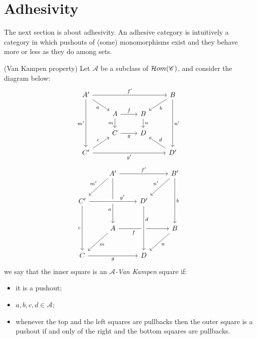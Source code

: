 \section{Adhesivity}\label{sect:adh}

The next section is about adhesivity.
An adhesive category is intuitively a category in which pushouts of (some) monomorphisms exist and they behave more or less as they do among sets. 

\begin{definition}(Van Kampen property)
    Let $\mathcal A$ be a subclass of $\mathcal{H}om(\mathscr{C})$, and consider the diagram below:
    \[
    \begin{tikzcd}[row sep = scriptsize]
        A' \arrow[ddd, "m'"swap] \arrow[rrr, "f'"] \arrow[dr, "a"swap] & & & B \arrow[ddd, "n'"] \arrow[dl, "b"] \\
        & A \arrow[r, "f"] \arrow[d, "m" swap] & B \arrow[d, "n"]   & \\
        & C \arrow[r, "g" swap]                & D                  & \\
        C' \arrow[rrr, "g'"swap] \arrow[ur, "c"] & & & D' \arrow[ul, "d" swap] 
    \end{tikzcd}
    \]
    \[\begin{tikzcd}[row sep=25, column sep=25]
	& {A'} && {B'} \\
	{C'} && {D'} \\
	& A && B \\
	C && D
	\arrow["{f'}", from=1-2, to=1-4]
	\arrow["{m'}"', from=1-2, to=2-1]
	\arrow["a"'{pos=0.7}, from=1-2, to=3-2]
	\arrow["{n'}"', from=1-4, to=2-3]
	\arrow["b", from=1-4, to=3-4]
	\arrow["{g'}"{pos=0.7}, from=2-1, to=2-3, crossing over]
	\arrow["c"', from=2-1, to=4-1]
	\arrow["f"'{pos=0.3}, from=3-2, to=3-4]
	\arrow["d"{pos=0.3}, from=2-3, to=4-3, crossing over]
	\arrow["m", from=3-2, to=4-1]
	\arrow["n", from=3-4, to=4-3]
	\arrow["g"', from=4-1, to=4-3]
    \end{tikzcd}\]
    we say that the inner square is an \emph{$\mathcal A$-Van Kampen} square if:
    \begin{itemize}
        \item it is a pushout;
        \item $a, b, c, d \in \mathcal{A}$;
        \item whenever the top and the left squares are pullbacks then the outer square is a pushout if and only of the right and the bottom squares are pullbacks.
    \end{itemize}
\end{definition}

